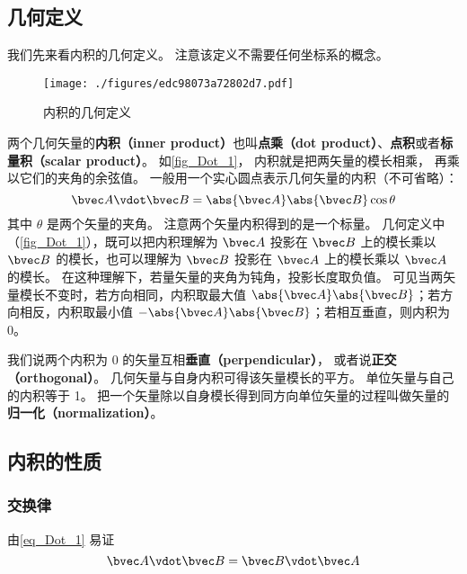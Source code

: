 

\subsection{几何定义}
我们先来看内积的几何定义。 注意该定义不需要任何坐标系的概念。
\begin{figure}[th]
\centering
\texttt{[image: ./figures/edc98073a72802d7.pdf]}
\caption{内积的几何定义}\label{fig_Dot_1}
\end{figure}

两个几何矢量的\textbf{内积（inner product）}也叫\textbf{点乘（dot product）}、\textbf{点积}或者\textbf{标量积（scalar product）}。 如\autoref{fig_Dot_1}， 内积就是把两矢量的模长相乘， 再乘以它们的夹角的余弦值。 一般用一个实心圆点表示几何矢量的内积（不可省略）：
\begin{equation}\label{eq_Dot_1}
\bvec A \vdot \bvec B = \abs{\bvec A} \abs{\bvec B} \cos\theta 
\end{equation}
其中 $\theta$ 是两个矢量的夹角。 注意两个矢量内积得到的是一个标量。 几何定义中（\autoref{fig_Dot_1}），既可以把内积理解为 $\bvec A$ 投影在 $\bvec B$ 上的模长乘以 $\bvec B$ 的模长，也可以理解为 $\bvec B$ 投影在 $\bvec A$ 上的模长乘以 $\bvec A$ 的模长。 在这种理解下，若量矢量的夹角为钝角，投影长度取负值。 可见当两矢量模长不变时，若方向相同，内积取最大值 $\abs{\bvec A}\abs{\bvec B}$；若方向相反，内积取最小值 $-\abs{\bvec A}\abs{\bvec B}$；若相互垂直，则内积为 0。

我们说两个内积为 0 的矢量互相\textbf{垂直（perpendicular）}， 或者说\textbf{正交（orthogonal）}。 几何矢量与自身内积可得该矢量模长的平方。 单位矢量与自己的内积等于 1。 把一个矢量除以自身模长得到同方向单位矢量的过程叫做矢量的\textbf{归一化（normalization）}。

\subsection{内积的性质}

\subsubsection{交换律}
由\autoref{eq_Dot_1} 易证
\begin{equation}\label{eq_Dot_2}
\bvec A \vdot \bvec B = \bvec B \vdot \bvec A
\end{equation}

